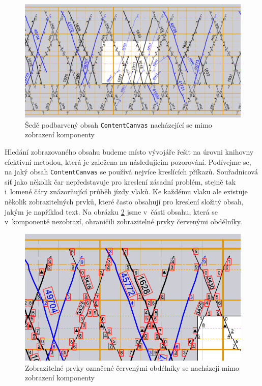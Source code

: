\begin{figure}[!bht]
	\includegraphics[width=\textwidth]{../img/kap3_platno_mimo_komponentu}
	\caption{Šedě podbarvený obsah \texttt{ContentCanvas} nacházející se mimo zobrazení komponenty}
	\label{fig:platno_mimo_komponentu}
\end{figure}

Hledání zobrazovaného obsahu budeme místo vývojáře řešit na úrovni \linebreak knihovny efektivní metodou, která je založena na následujícím pozorování. Podívejme se, na jaký obsah \texttt{ContentCanvas} se používá nejvíce kreslících příkazů. Souřadnicová síť jako několik čar nepředstavuje pro kreslení zásadní problém, stejně tak i~lomené čáry znázorňující průběh jízdy vlaků. Ke každému vlaku ale existuje několik zobrazitelných prvků, které často obsahují pro kreslení složitý obsah, jakým je například text. Na obrázku \ref{fig:prvky_mimo_komponentu} jsme v~části obsahu, která se v~komponentě nezobrazí, ohraničili zobrazitelné prvky červenými obdélníky.

\begin{figure}[!hbt]
	\includegraphics[width=\textwidth]{../img/kap3_zobrazitelne_prvky_mimo_komponentu}
	\caption{Zobrazitelné prvky označené červenými obdélníky se nacházejí mimo zobrazení komponenty}
	\label{fig:prvky_mimo_komponentu}
\end{figure}

